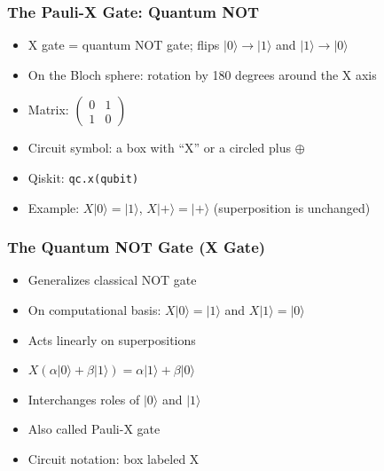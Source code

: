 \begin{frame}[fragile]\frametitle{The Pauli-X Gate: Quantum NOT}
\begin{itemize}
\item X gate = quantum NOT gate; flips $|0\rangle \to |1\rangle$ and $|1\rangle \to |0\rangle$
\item On the Bloch sphere: rotation by 180 degrees around the X axis
\item Matrix: $\begin{pmatrix}0 & 1 \\ 1 & 0\end{pmatrix}$
\item Circuit symbol: a box with ``X'' or a circled plus $\oplus$
\item Qiskit: \texttt{qc.x(qubit)}
\item Example: $X|0\rangle = |1\rangle$, $X|+\rangle = |+\rangle$ (superposition is unchanged)
\end{itemize}
\end{frame}

\begin{frame}[fragile]\frametitle{The Quantum NOT Gate (X Gate)}
\begin{itemize}
\item Generalizes classical NOT gate
\item On computational basis: $X|0\rangle = |1\rangle$ and $X|1\rangle = |0\rangle$
\item Acts linearly on superpositions
\item $X(\alpha|0\rangle + \beta|1\rangle) = \alpha|1\rangle + \beta|0\rangle$
\item Interchanges roles of $|0\rangle$ and $|1\rangle$
\item Also called Pauli-X gate
\item Circuit notation: box labeled X
\end{itemize}
\end{frame}

